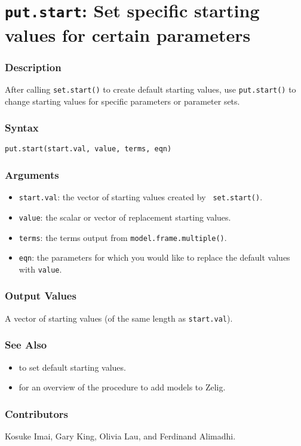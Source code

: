 \section{{\tt put.start}: Set specific starting values for certain parameters}
\label{put.start}

\subsubsection{Description}

After calling {\tt set.start()} to create default starting values, use
{\tt put.start()} to change starting values for specific parameters or
parameter sets. 

\subsubsection{Syntax}
\begin{verbatim}
put.start(start.val, value, terms, eqn)
\end{verbatim}

\subsubsection{Arguments}

\begin{itemize}
\item {\tt start.val}: the vector of starting values created by {\tt
set.start()}. 
\item {\tt value}: the scalar or vector of replacement starting
values.  
\item {\tt terms}: the terms output from {\tt model.frame.multiple()}.
\item {\tt eqn}: the parameters for which you would like to replace
the default values with {\tt value}.    
\end{itemize}

\subsubsection{Output Values}
A vector of starting values (of the same length as {\tt start.val}).  

\subsubsection{See Also}
\begin{itemize}
\item {} to set default starting values.  
\item {} for an overview of the procedure to add
  models to Zelig.
\end{itemize}

\subsubsection{Contributors}

Kosuke Imai, Gary King, Olivia Lau, and Ferdinand Alimadhi.

